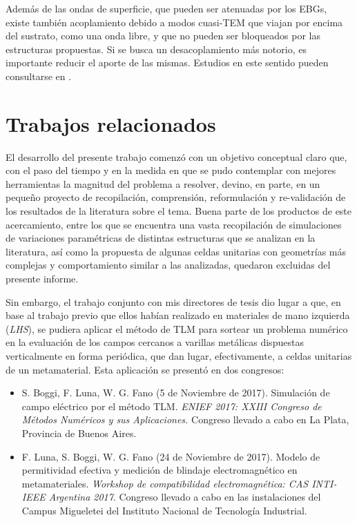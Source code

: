 Además de las ondas de superficie, que pueden ser atenuadas por los EBGs, existe también acoplamiento debido a modos cuasi-TEM que viajan por encima del sustrato, como una onda libre, y que no pueden ser bloqueados por las estructuras propuestas. Si se busca un desacoplamiento más notorio, es importante reducir el aporte de las mismas. Estudios en este sentido pueden consultarse en \cite{Asimonis:designoptimization}.

\section{Trabajos relacionados}

El desarrollo del presente trabajo comenzó con un objetivo conceptual claro que, con el paso del tiempo y en la medida en que se pudo contemplar con mejores herramientas la magnitud del problema a resolver, devino, en parte, en un pequeño proyecto de recopilación, comprensión, reformulación y re-validación de los resultados de la literatura sobre el tema. Buena parte de los productos de este acercamiento, entre los que se encuentra una vasta recopilación de simulaciones de variaciones paramétricas de distintas estructuras que se analizan en la literatura, así como la propuesta de algunas celdas unitarias con geometrías más complejas y comportamiento similar a las analizadas, quedaron excluidas del presente informe.

Sin embargo, el trabajo conjunto con mis directores de tesis dio lugar a que, en base al trabajo previo que ellos habían realizado en materiales de mano izquierda (\textit{LHS}), se pudiera aplicar el método de TLM para sortear un problema numérico en la evaluación de los campos cercanos a varillas metálicas dispuestas verticalmente en forma periódica, que dan lugar, efectivamente, a celdas unitarias de un metamaterial. Esta aplicación se presentó en dos congresos:

\begin{itemize}
 

	\item S. Boggi, F. Luna, W. G. Fano (5 de Noviembre de 2017). Simulación de campo eléctrico por el método TLM. \textit{ENIEF 2017: XXIII Congreso de Métodos Numéricos y sus Aplicaciones.} Congreso llevado a cabo en La Plata, Provincia de Buenos Aires.

	\item F. Luna, S. Boggi, W. G. Fano (24 de Noviembre de 2017). Modelo de permitividad efectiva y medición de blindaje electromagnético en metamateriales. \textit{Workshop de compatibilidad electromagnética: CAS INTI-IEEE Argentina 2017}. Congreso llevado a cabo en las instalaciones del Campus Migueletei del Instituto Nacional de Tecnología Industrial.
	
\end{itemize}

